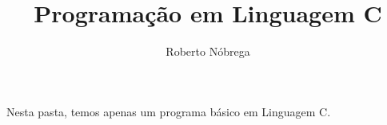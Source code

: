 \documentclass[a4paper,12pt]{article}
\title{Programação em Linguagem C}
\author{Roberto Nóbrega}
\begin{document}
	\maketitle
	Nesta pasta, temos apenas um programa básico em Linguagem C.
\end{document}
